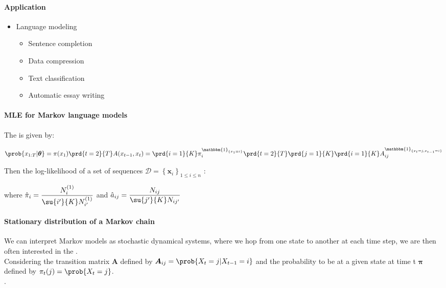 \paragraph{Application}
\begin{itemize}
    \item Language modeling
    \begin{itemize}
        \item Sentence completion
        \item Data compression
        \item Text classification
        \item Automatic essay writing
    \end{itemize}
\end{itemize}
\paragraph{MLE for Markov language models}
The  is given by:
\begin{center}
    $
\prob{x_{1:T}|\bm{\theta}} = \pi(x_{1})\prd{t=2}{T}A(x_{t-1},x_{t}) = 
\prd{i=1}{K}\pi_{i}^{\mathbbm{1}_{\{x_{1}=i\}}}\prd{t=2}{T}\prd{j=1}{K}\prd{i=1}{K}
A_{ij}^{\mathbbm{1}_{\{x_{t}=j,x_{t-1}=i\}}}
$
\end{center}

Then the log-likelihood of a set of sequences $\mathcal{D}=\left\{\bm{x}_{i}\right\}_{1\leq i\leq n}$
:
\begin{center}
\end{center}
where $\hat{\pi}_{i}=\dfrac{N_{i}^{(1)}}{\su{i'}{K}N_{i'}^{(1)}}$ and 
$\hat{a}_{ij}=\dfrac{N_{ij}}{\su{j'}{K}N_{ij'}}$

\paragraph{Stationary distribution of a Markov chain}
We can interpret Markov models as stochastic dynamical systems, where we hop from one state to 
another at each time step, we are then often interested in the .\\
Considering the transition matrix $\bm{A}$ defined by $\bm{A}_{ij}=\prob{X_{t}=j|X_{t-1}=i}$ and 
the probability to be at a given state at time t $\bm{\pi}$ defined by $\pi_{t}(j)=\prob{X_{t}=j}$.\\
.\\



